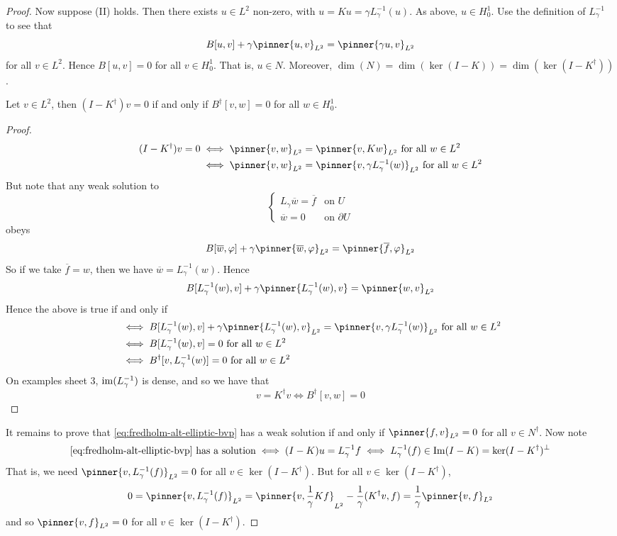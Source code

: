 \documentclass{article}
\begin{document}
\begin{proof}
Now suppose (II) holds. Then there exists \(u \in L^2\) non-zero, with \(u = Ku = \gamma L_\gamma^{-1}(u)\). As above, \(u \in H^1_0\). Use the definition of \(L_\gamma^{-1}\) to see that
\[B[u, v] + \gamma\pinner{u, v}_{L^2} = \pinner{\gamma u, v}_{L^2}\]
for all \(v \in L^2\). Hence \(B[u, v] = 0\) for all \(v \in H^1_0\). That is, \(u \in N\). Moreover, \(\dim(N) = \dim(\ker(I - K)) = \dim(\ker(I - K^\dagger))\).

\begin{claim}
    Let \(v \in L^2\), then \((I - K^\dagger)v = 0\) if and only if \(B^\dagger[v, w] = 0\) for all \(w \in H^1_0\).
\end{claim}
\begin{proof}
    \begin{align*}
        (I - K^\dagger)v = 0 &\iff \pinner{v, w}_{L^2} = \pinner{v, Kw}_{L^2} \text{ for all }w \in L^2 \\
        &\iff \pinner{v, w}_{L^2} = \pinner{v, \gamma L_\gamma^{-1}(w)}_{L^2} \text{ for all }w \in L^2
    \end{align*}
    But note that any weak solution to
    \[\begin{cases}
        L_\gamma \overline w = \overline f &\text{on }U \\
        \overline w = 0 &\text{on }\partial U
    \end{cases}\]
    obeys
    \[B[\overline w, \varphi] + \gamma\pinner{\overline w, \varphi}_{L^2} = \pinner{\overline f, \varphi}_{L^2}\]
    So if we take \(\overline f = w\),  then we have \(\overline{w} = L_\gamma^{-1}(w)\). Hence
    \[B[L_\gamma^{-1}(w), v] + \gamma\pinner{L_\gamma^{-1}(w), v} = \pinner{w, v}_{L^2}\]
    Hence the above is true if and only if
    \begin{align*}
        &\iff 
        B[L_\gamma^{-1}(w), v] + \gamma\pinner{L_\gamma^{-1}(w), v}_{L^2} = \pinner{v, \gamma L_\gamma^{-1}(w)}_{L^2} \text{ for all }w \in L^2 \\
        &\iff B[L_\gamma^{-1}(w), v] = 0 \text{ for all }w \in L^2 \\
        &\iff B^\dagger[v, L_\gamma^{-1}(w)] = 0 \text{ for all }w\in L^2
    \end{align*}
    On examples sheet 3, \(\operatorname{im}(L_\gamma^{-1})\) is dense, and so we have that
    \[v = K^\dagger v \iff B^\dagger[v, w] = 0\]
\end{proof}
It remains to prove that \cref{eq:fredholm-alt-elliptic-bvp} has a weak solution if and only if \(\pinner{f, v}_{L^2} = 0\) for all \(v \in N^\dagger\). Now note
\[\text{\cref{eq:fredholm-alt-elliptic-bvp} has a solution} \iff (I - K)u = L_\gamma^{-1}f \iff L_\gamma^{-1}(f) \in \Im(I - K) = \ker(I - K^\dagger)^\perp\]
That is, we need \(\pinner{v, L_\gamma^{-1}(f)}_{L^2} = 0\) for all \(v \in \ker(I - K^\dagger)\). But for all \(v \in \ker(I - K^\dagger)\),
\[0 = \pinner{v, L_\gamma^{-1}(f)}_{L^2} = \pinner{v, \frac{1}{\gamma}Kf}_{L^2} - \frac{1}{\gamma}(K^\dagger v, f) = \frac{1}{\gamma}\pinner{v, f}_{L^2}\]
and so \(\pinner{v, f}_{L^2} = 0\) for all \(v \in \ker(I - K^\dagger)\).
\end{proof}
\end{document}
